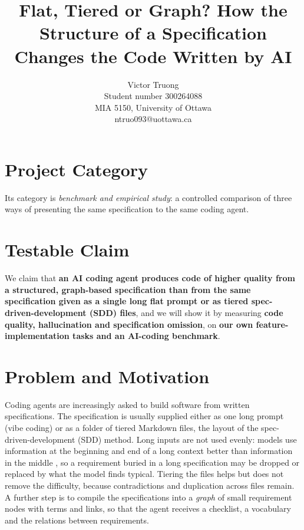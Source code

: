 \documentclass{article}
\title{Flat, Tiered or Graph? How the Structure of a Specification
Changes the Code Written by AI}
\author{%
  Victor Truong \\
  Student number 300264088 \\
  MIA 5150, University of Ottawa \\
  ntruo093@uottawa.ca \\
}
\begin{document}
\maketitle

\section{Project Category}

Its category is \emph{benchmark and empirical study}: a controlled comparison of three ways of
presenting the same specification to the same coding agent.

\section{Testable Claim}

We claim that \textbf{an AI coding agent produces code of higher quality from a structured, graph-based
specification than from the same specification given as a single long flat prompt or as tiered
spec-driven-development (SDD) files}, and we will show it by measuring \textbf{code quality, hallucination
and specification omission}, on \textbf{our own feature-implementation tasks and an AI-coding benchmark}.

\section{Problem and Motivation}

Coding agents are increasingly asked to build software from written specifications. The specification
is usually supplied either as one long prompt (vibe coding) or as a folder of tiered Markdown files,
the layout of the spec-driven-development (SDD) method. Long inputs are not used evenly: models use
information at the beginning and end of a long context better than information in the middle \citep{liu2024lost},
so a requirement buried in a long specification may be dropped or replaced by what the model finds typical.
Tiering the files helps but does not remove the difficulty, because contradictions and duplication across files remain.
A further step is to compile the specifications into a \emph{graph} of small requirement nodes with terms and links, so that the
agent receives a checklist, a vocabulary and the relations between requirements.
\end{document}
